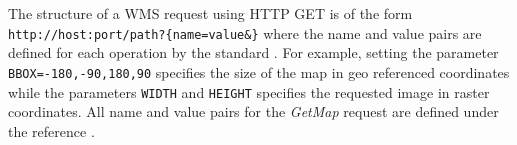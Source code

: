 The structure of a WMS request using HTTP GET is of the form \\ \texttt{http://host\lbrack:port\rbrack/path\lbrack?\{name\lbrack=value\rbrack\&\}} where the name and value pairs are defined for each operation by the standard \cite{wms06}. For example, setting the parameter \texttt{BBOX=-180,-90,180,90} specifies the size of the map in geo referenced coordinates while the parameters \texttt{WIDTH} and \texttt{HEIGHT} specifies the requested image in raster coordinates. All name and value pairs for the \emph{GetMap} request are defined under the reference \cite{wms06}.
